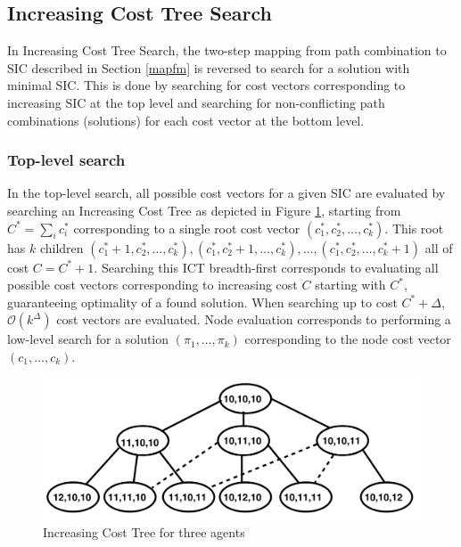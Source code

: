 \documentclass[english]{article}
\begin{document}
	\subsection{Increasing Cost Tree Search}
	\label{icts}
	In Increasing Cost Tree Search\cite{sharon2011}, the two-step mapping from path combination to SIC described in Section \ref{mapfm} is reversed to search for a solution with minimal SIC. This is done by searching for cost vectors corresponding to increasing SIC at the top level and searching for non-conflicting path combinations (solutions) for each cost vector at the bottom level. 
	
	\subsubsection{Top-level search}
	In the top-level search, all possible cost vectors for a given SIC are evaluated by searching an Increasing Cost Tree as depicted in Figure \ref{fig:ict}, starting from $C^* = \sum_i c^*_i$ corresponding to a single root cost vector $(c^*_1,c^*_2,\ldots,c^*_k)$. This root has $k$ children $(c^*_1 + 1,c^*_2,\ldots,c^*_k),(c^*_1,c^*_2 + 1,\ldots,c^*_k),\ldots,(c^*_1,c^*_2,\ldots,c^*_k + 1)$ all of cost $C = C^* + 1$. Searching this ICT breadth-first corresponds to evaluating all possible cost vectors corresponding to increasing cost $C$ starting with $C^*$, guaranteeing optimality of a found solution. When searching up to  cost $C^* + \Delta$, $\mathcal{O}(k^\Delta)$ cost vectors are evaluated. Node evaluation corresponds to performing a low-level search for a solution $(\pi_1,\ldots,\pi_k)$ corresponding to the node cost vector $(c_1,\ldots,c_k)$.
	
	\begin{figure}[t]
		\centering
		\includegraphics[width=0.5\linewidth]{img/ict}
		\caption{Increasing Cost Tree for three agents \cite{sharon2011}}
		\label{fig:ict}
		\vspace{-30pt}
	\end{figure}
	\begin{figure}
		
	\end{figure}
	
\end{document}
